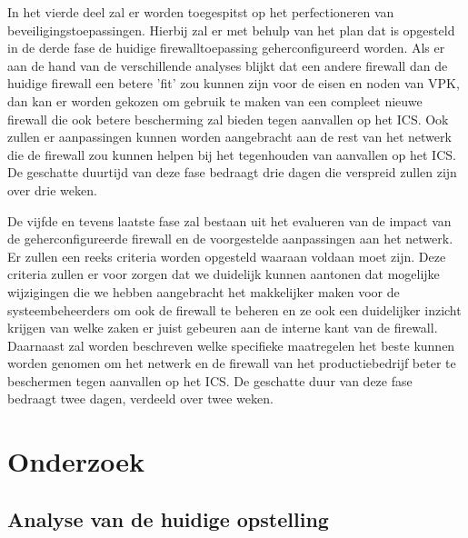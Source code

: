 In het vierde deel zal er worden toegespitst op het perfectioneren van beveiligingstoepassingen. Hierbij zal er met behulp van het plan dat is opgesteld in de derde fase de huidige firewalltoepassing geherconfigureerd worden. Als er aan de hand van de verschillende analyses blijkt dat een andere firewall dan de huidige firewall een betere 'fit' zou kunnen zijn voor de eisen en noden van VPK, dan kan er worden gekozen om gebruik te maken van een compleet nieuwe firewall die ook betere bescherming zal bieden tegen aanvallen op het ICS. Ook zullen er aanpassingen kunnen worden aangebracht aan de rest van het netwerk die de firewall zou kunnen helpen bij het tegenhouden van aanvallen op het ICS. De geschatte duurtijd van deze fase bedraagt drie dagen die verspreid zullen zijn over drie weken.

De vijfde en tevens laatste fase zal bestaan uit het evalueren van de impact van de geherconfigureerde firewall en de voorgestelde aanpassingen aan het netwerk. Er zullen een reeks criteria worden opgesteld waaraan voldaan moet zijn. Deze criteria zullen er voor zorgen dat we duidelijk kunnen aantonen dat mogelijke wijzigingen die we hebben aangebracht het makkelijker maken voor de systeembeheerders om ook de firewall te beheren en ze ook een duidelijker inzicht krijgen van welke zaken er juist gebeuren aan de interne kant van de firewall. Daarnaast zal worden beschreven welke specifieke maatregelen het beste kunnen worden genomen om het netwerk en de firewall van het productiebedrijf beter te beschermen tegen aanvallen op het ICS. De geschatte duur van deze fase bedraagt twee dagen, verdeeld over twee weken.  

\chapter{Onderzoek}

\label{ch:onderzoek}

\section{Analyse van de huidige opstelling}

